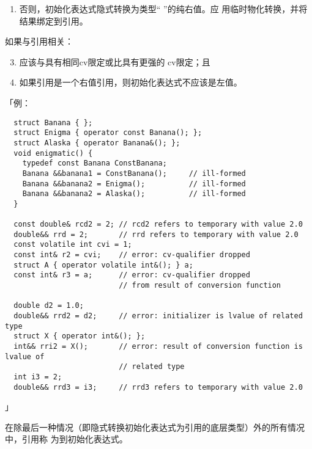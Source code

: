\begin{enumerate}
{\begin{enumerate}
{\begin{enumerate}
{            过用户定义转换（\ref{dcl.init}，\ref{over.match.copy}，
            \ref{over.match.conv}）使用`` ''类型对象的拷贝初始化
            规则，考虑用户定义转换；如果对应非引用拷贝初始化是病态的则程序是病态
            的。按非引用拷贝初始化所述，转换函数的调用结果用于直接初始化引用。对
            该直接初始化，不考虑用户定义转换。}
          \item{否则，初始化表达式隐式转换为类型`` ''的纯右值。应
            用临时物化转换，并将结果绑定到引用。}
        \end{enumerate}
        如果与引用相关：
        \begin{enumerate}
          \setcounter{enumiii}{2}
          \item{应该与具有相同cv限定或比具有更强的
            cv限定；且}
          \item{如果引用是一个右值引用，则初始化表达式不应该是左值。}
        \end{enumerate}
        「例：
\begin{lstlisting}
  struct Banana { };
  struct Enigma { operator const Banana(); };
  struct Alaska { operator Banana&(); };
  void enigmatic() {
    typedef const Banana ConstBanana;
    Banana &&banana1 = ConstBanana();     // ill-formed
    Banana &&banana2 = Enigma();          // ill-formed
    Banana &&banana2 = Alaska();          // ill-formed
  }

  const double& rcd2 = 2; // rcd2 refers to temporary with value 2.0
  double&& rrd = 2;       // rrd refers to temporary with value 2.0
  const volatile int cvi = 1;
  const int& r2 = cvi;    // error: cv-qualifier dropped
  struct A { operator volatile int&(); } a;
  const int& r3 = a;      // error: cv-qualifier dropped
                          // from result of conversion function

  double d2 = 1.0;
  double&& rrd2 = d2;     // error: initializer is lvalue of related type
  struct X { operator int&(); };
  int&& rri2 = X();       // error: result of conversion function is lvalue of
                          // related type
  int i3 = 2;
  double&& rrd3 = i3;     // rrd3 refers to temporary with value 2.0
\end{lstlisting}」
      }
    \end{enumerate}
  }
\end{enumerate}
在除最后一种情况（即隐式转换初始化表达式为引用的底层类型）外的所有情况中，引用称
为到初始化表达式。

